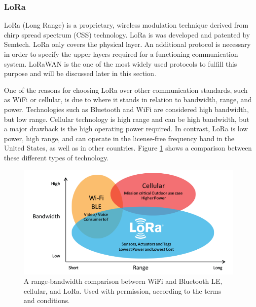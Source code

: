 \subsubsection{LoRa}
LoRa (Long Range) is a proprietary, wireless modulation technique derived from chirp spread spectrum (CSS) technology. LoRa is was developed and patented by Semtech. LoRa only covers the physical layer. An additional protocol is necessary in order to specify the upper layers required for a functioning communication system. LoRaWAN is the one of the most widely used protocols to fulfill this purpose and will be discussed later in this section.

One of the reasons for choosing LoRa over other communication standards, such as WiFi or cellular, is due to where it stands in relation to bandwidth, range, and power. Technologies such as Bluetooth and WiFi are considered high bandwidth, but low range. Cellular technology is high range and can be high bandwidth, but a major drawback is the high operating power required. In contrast, LoRa is low power, high range, and can operate in the license-free frequency band in the United States, as well as in other countries. Figure \ref{fig:lora-range-bandwidth} shows a comparison between these different types of technology.

\begin{figure}
    \centering
    \includegraphics[width=6in]{figures/lora-range-bandwidth.png}
    \caption{A range-bandwidth comparison between WiFi and Bluetooth LE, cellular, and LoRa. Used with permission, according to the terms and conditions.}
    \label{fig:lora-range-bandwidth}
\end{figure}


